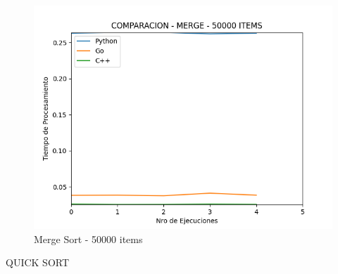 \documentclass[12pt]{article} %
\begin{document}
    \begin{figure}[H]
    \centering
    \includegraphics[width=\textwidth]{merge_50000}
    \caption{Merge Sort - 50000 items}
    \end{figure}

    \vspace{8cm}




QUICK SORT
\end{document}
